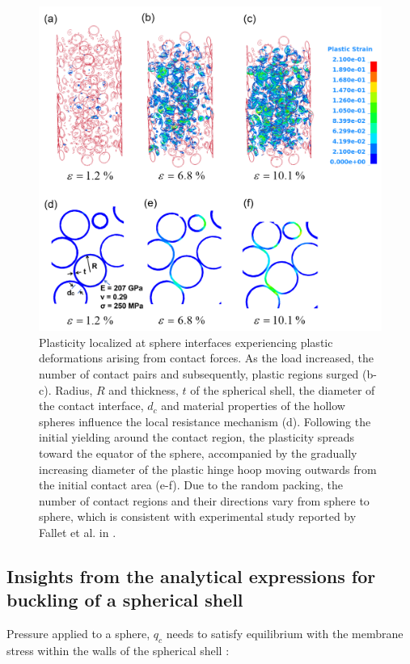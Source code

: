 \documentclass[review]{elsarticle}
\begin{document}
{\begin{figure}[htbp]
	\begin{center}
		\includegraphics[width=0.80\linewidth]
		{Tex-Figures/Fig11-PlasticBuckling.png}
		\caption{Plasticity localized at sphere interfaces experiencing plastic deformations arising from contact forces. As the load increased, the number of contact pairs and subsequently, plastic regions surged (b-c). Radius, $R$ and thickness, $t$ of the spherical shell, the diameter of the contact interface, $d_c$ and material properties of the hollow spheres influence the local resistance mechanism (d). Following the initial yielding around the contact region, the plasticity spreads toward the equator of the sphere, accompanied by the gradually increasing diameter of the plastic hinge hoop moving outwards from the initial contact area (e-f). Due to the random packing, the number of contact regions and their directions vary from sphere to sphere, which is consistent with experimental study reported by Fallet et al. in \cite{Fallet2008}.}
		\label{Fig:SimulatedBuckling}
	\end{center}
\end{figure}


\subsection{Insights from the analytical expressions for buckling of a spherical shell}

Pressure applied to a sphere, $q_c$ needs to satisfy equilibrium with the membrane stress within the walls of the spherical shell \cite{TimGer2009}:

}
\end{document}
